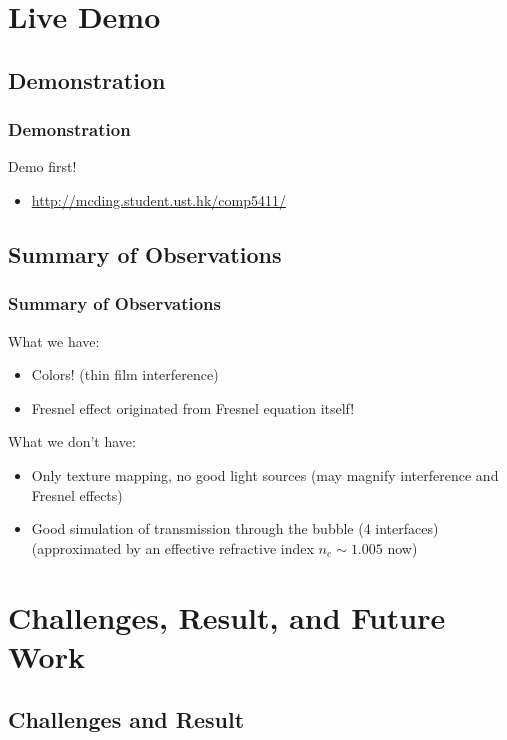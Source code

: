 \documentclass{beamer}
\begin{document}
\section{Live Demo}

\subsection{Demonstration}

\begin{frame}
	\frametitle{Demonstration}
	Demo first!
	\begin{itemize}
		\item \url{http://mcding.student.ust.hk/comp5411/}
	\end{itemize}
\end{frame}


\subsection{Summary of Observations}

\begin{frame}
	\frametitle{Summary of Observations}
	What we have:
	\begin{itemize}
		\item Colors! (thin film interference)
		\item Fresnel effect originated from Fresnel equation itself!
	\end{itemize}
	What we don't have:
	\begin{itemize}
		\item Only texture mapping, no good light sources (may magnify interference and Fresnel effects)
		\item Good simulation of transmission through the bubble (4 interfaces) (approximated by an effective refractive index $ n_e \sim 1.005 $ now)
	\end{itemize}
\end{frame}

\section{Challenges, Result, and Future Work}

\subsection{Challenges and Result}
\end{document}
